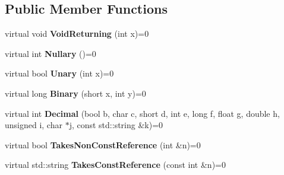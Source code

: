\subsection*{Public Member Functions}
\begin{DoxyCompactItemize}
\item 
\mbox{\label{classtesting_1_1gmock__function__mocker__test_1_1FooInterface_ab62327ee683b362d9e5579266b74a09c}} 
virtual void {\bfseries Void\+Returning} (int x)=0
\item 
\mbox{\label{classtesting_1_1gmock__function__mocker__test_1_1FooInterface_a9440f75381e8a44977c2caee7914098f}} 
virtual int {\bfseries Nullary} ()=0
\item 
\mbox{\label{classtesting_1_1gmock__function__mocker__test_1_1FooInterface_a6f28f91c92b59da029ed0cb61c3d1da6}} 
virtual bool {\bfseries Unary} (int x)=0
\item 
\mbox{\label{classtesting_1_1gmock__function__mocker__test_1_1FooInterface_a8d6e54401a3addca464903257529ace4}} 
virtual long {\bfseries Binary} (short x, int y)=0
\item 
\mbox{\label{classtesting_1_1gmock__function__mocker__test_1_1FooInterface_a2a415a61b9a9c7a69bba9a4b5ef2a63e}} 
virtual int {\bfseries Decimal} (bool b, char c, short d, int e, long f, float g, double h, unsigned i, char $\ast$j, const std\+::string \&k)=0
\item 
\mbox{\label{classtesting_1_1gmock__function__mocker__test_1_1FooInterface_aaf21cef138ffa4a8f2372c7fbed95b18}} 
virtual bool {\bfseries Takes\+Non\+Const\+Reference} (int \&n)=0
\item 
\mbox{\label{classtesting_1_1gmock__function__mocker__test_1_1FooInterface_a4765c543c11b5d544a35f9fe8de758bd}} 
virtual std\+::string {\bfseries Takes\+Const\+Reference} (const int \&n)=0

\end{DoxyCompactItemize}
